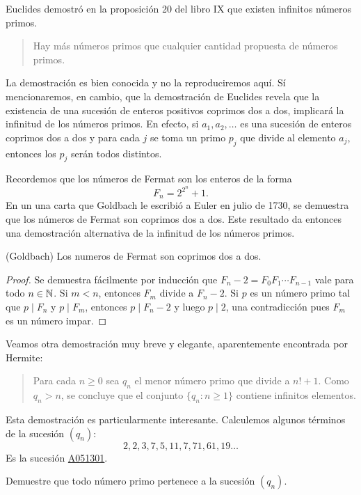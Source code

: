 Euclides demostró en la proposición 20 del libro IX que existen infinitos
números primos. 

\begin{quote}
	Hay más números primos que cualquier cantidad propuesta de números primos.
\end{quote}
La demostración es bien conocida y no la reproduciremos aquí. Sí mencionaremos,
en cambio, que la demostración de Euclides revela que la existencia de una
sucesión de enteros positivos coprimos dos a dos, implicará la infinitud de los
números primos. En efecto, si $a_1,a_2,\dots$ es una sucesión de enteros
coprimos dos a dos y para cada $j$ se toma un primo $p_j$ que divide al
elemento $a_j$, entonces los $p_j$ serán todos distintos.

Recordemos que los números de Fermat son los enteros de la forma
\[
	F_n=2^{2^n}+1.
\]
En un una carta que Goldbach le escribió a Euler en julio de 1730, se demuestra
que los números de Fermat son coprimos dos a dos. Este resultado da entonces
una demostración alternativa de la infinitud de los números primos.

\begin{theorem}(Goldbach)
	Los numeros de Fermat son coprimos dos a dos.
\end{theorem}

\begin{proof}
	Se demuestra fácilmente por inducción que $F_n-2=F_0F_1\cdots F_{n-1}$ vale
	para todo $n\in\mathbb{N}$. Si $m<n$, entonces $F_m$ divide a $F_n-2$. Si $p$ es un
	número primo tal que $p\mid F_n$ y $p\mid F_m$, entonces $p\mid F_n-2$ y
	luego $p\mid 2$, una contradicción pues $F_m$ es un número impar. 
\end{proof}

Veamos otra demostración muy breve y elegante, aparentemente encontrada por Hermite:

\begin{quote}
Para cada $n\geq0$ sea $q_n$ el menor número primo que divide a $n!+1$. Como
$q_n>n$, se concluye que el conjunto $\{q_n:n\geq1\}$ contiene infinitos elementos.
\end{quote}
Esta demostración es particularmente interesante. Calculemos algunos
términos de la sucesión $(q_n)$:
\[
	2,2,3,7,5,11,7,71,61,19\dots
\]
Es la sucesión \href{https://oeis.org/A051301}{A051301}.

\begin{exercise}
	Demuestre que todo número primo pertenece a la sucesión $(q_n)$.
\end{exercise}

